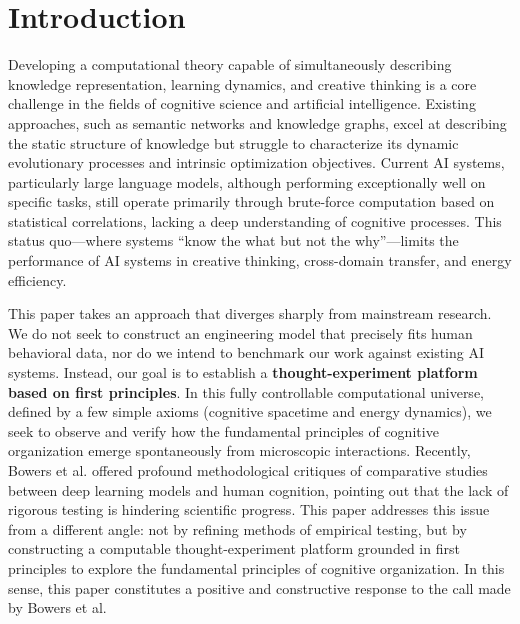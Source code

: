 \documentclass[10pt,onecolumn]{article}
\begin{document}
\begin{abstract}
\textbf{Keywords:} Cognitive graph theory, energy minimization, group-algebraic theory, concept compression, first-principles transfer, cognitive dynamics, thought experiments
\end{abstract}

\newpage
\section{Introduction}

Developing a computational theory capable of simultaneously describing knowledge representation, learning dynamics, and creative thinking is a core challenge in the fields of cognitive science and artificial intelligence. Existing approaches, such as semantic networks and knowledge graphs, excel at describing the static structure of knowledge but struggle to characterize its dynamic evolutionary processes and intrinsic optimization objectives. Current AI systems, particularly large language models, although performing exceptionally well on specific tasks, still operate primarily through brute-force computation based on statistical correlations, lacking a deep understanding of cognitive processes. This status quo—where systems “know the what but not the why”—limits the performance of AI systems in creative thinking, cross-domain transfer, and energy efficiency.

This paper takes an approach that diverges sharply from mainstream research. We do not seek to construct an engineering model that precisely fits human behavioral data, nor do we intend to benchmark our work against existing AI systems. Instead, our goal is to establish a \textbf{thought-experiment platform based on first principles}. In this fully controllable computational universe, defined by a few simple axioms (cognitive spacetime and energy dynamics), we seek to observe and verify how the fundamental principles of cognitive organization emerge spontaneously from microscopic interactions. Recently, Bowers et al. \cite{bowers2023importance} offered profound methodological critiques of comparative studies between deep learning models and human cognition, pointing out that the lack of rigorous testing is hindering scientific progress. This paper addresses this issue from a different angle: not by refining methods of empirical testing, but by constructing a computable thought-experiment platform grounded in first principles to explore the fundamental principles of cognitive organization. In this sense, this paper constitutes a positive and constructive response to the call made by Bowers et al.
\end{document}
